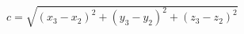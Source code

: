 \documentclass{standalone}
\begin{document}
    $c = \sqrt{ (x_3 - x_2)^2 + (y_3 - y_2)^2 + (z_3 - z_2)^2 }$
\end{document}
